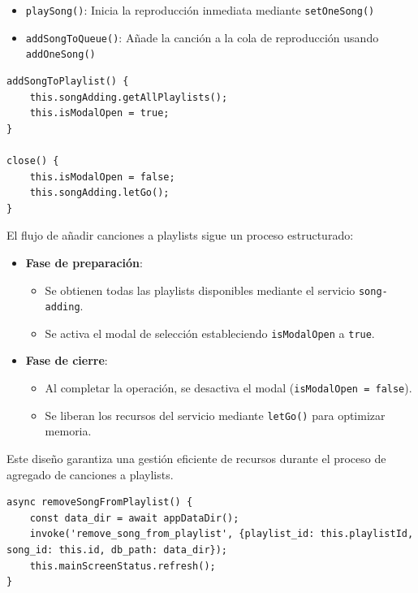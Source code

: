 \documentclass[11pt, a4paper]{article}
\begin{document}
                \begin{itemize}
                    \item \verb|playSong()|: Inicia la reproducción inmediata mediante \verb|setOneSong()|
                    \item \verb|addSongToQueue()|: Añade la canción a la cola de reproducción usando \verb|addOneSong()|
                \end{itemize}

                \begin{lstlisting}[caption={addSongToPlaylist()}]
addSongToPlaylist() {
    this.songAdding.getAllPlaylists();
    this.isModalOpen = true;
}

close() {
    this.isModalOpen = false;
    this.songAdding.letGo();
}
                \end{lstlisting}

                El flujo de añadir canciones a playlists sigue un proceso estructurado:

                \begin{itemize}
                    \item \textbf{Fase de preparación}:
                    \begin{itemize}
                        \item Se obtienen todas las playlists disponibles mediante el servicio \verb|song-adding|.
                        \item Se activa el modal de selección estableciendo \verb|isModalOpen| a \verb|true|.
                    \end{itemize}
                    
                    \item \textbf{Fase de cierre}:
                    \begin{itemize}
                        \item Al completar la operación, se desactiva el modal (\verb|isModalOpen = false|).
                        \item Se liberan los recursos del servicio mediante \verb|letGo()| para optimizar memoria.
                    \end{itemize}
                \end{itemize}

                Este diseño garantiza una gestión eficiente de recursos durante el proceso de agregado de canciones a playlists.

                \begin{lstlisting}[caption={removeSongFromPlaylist()}]
async removeSongFromPlaylist() {
    const data_dir = await appDataDir();
    invoke('remove_song_from_playlist', {playlist_id: this.playlistId, song_id: this.id, db_path: data_dir});
    this.mainScreenStatus.refresh();
}
                \end{lstlisting}
\end{document}
